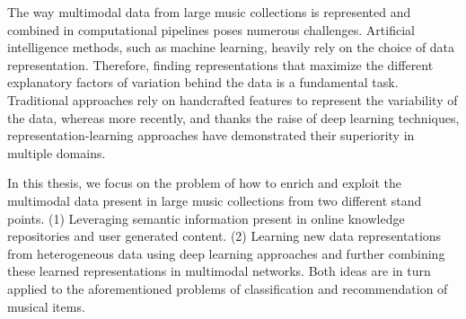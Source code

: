 The way multimodal data from large music collections is represented and combined in computational pipelines poses numerous challenges. Artificial intelligence methods, such as machine learning, heavily rely on the choice of data representation. Therefore, finding representations that maximize the different explanatory factors of variation behind the data is a fundamental task. Traditional approaches rely on handcrafted features to represent the variability of the data, whereas more recently, and thanks the raise of deep learning techniques, representation-learning approaches have demonstrated their superiority in multiple domains.

In this thesis, we focus on the problem of how to enrich and exploit the multimodal data present in large music collections from two different stand points. (1) Leveraging semantic information present in online knowledge repositories and user generated content. (2) Learning new data representations from heterogeneous data using deep learning approaches and further combining these learned representations in multimodal networks. Both ideas are in turn applied to the aforementioned problems of classification and recommendation of musical items.




